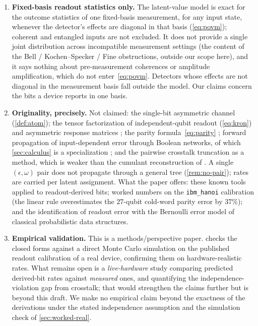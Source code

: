 \documentclass[11pt]{article}
\numberwithin{equation}{section}
\theoremstyle{plain}
\theoremstyle{definition}
\theoremstyle{remark}
\newcommand{\eps}{\epsilon}
\begin{document}
\begin{enumerate}[leftmargin=1.6em]
  \item \textbf{Fixed-basis readout statistics only.} The latent-value model is
        exact for the outcome statistics of one fixed-basis measurement, for any
        input state, whenever the detector's effects are diagonal in that basis
        (\cref{eq:povm}); coherent and entangled inputs are not excluded. It
        does not provide a single joint distribution across incompatible
        measurement settings (the content of the Bell / Kochen--Specker / Fine
        obstructions, outside our scope here), and it says nothing about
        pre-measurement coherences or amplitude amplification, which do not
        enter~\eqref{eq:povm}. Detectors whose effects are not diagonal in the
        measurement basis fall outside the model. Our claims concern the bits a
        device reports in one basis.

  \item \textbf{Originality, precisely.} Not claimed: the single-bit asymmetric
        channel (\cref{def:atom}); the tensor factorization of independent-qubit
        readout (\cref{eq:kron}) and asymmetric response matrices
        \citep{smith2021bitflip}; the parity formula~\eqref{eq:parity}
        \citep{gallager1962ldpc,matsui1993linear}; forward propagation of
        input-dependent error through Boolean networks, of which
        \cref{sec:calculus} is a specialization
        \citep{parker1975probabilistic,krishnaswamy2008ptm}; and the pairwise
        crosstalk truncation as a method, which is weaker than the cumulant
        reconstruction of \citet{hamilton2020scalable}. A single
        $(\eps,\omega)$ pair does not propagate through a general tree
        (\cref{rem:no-pair}); rates are carried per latent assignment. What
        the paper offers: these known tools applied to readout-derived bits;
        worked numbers on the \texttt{ibm\_hanoi} calibration (the linear rule
        overestimates the $27$-qubit cold-word parity error by $37\%$); and the
        identification of readout error with the Bernoulli error model of
        classical probabilistic data structures.

  \item \textbf{Empirical validation.} This is a methods/perspective paper.
         checks the closed forms against a direct Monte Carlo
        simulation on the published readout calibration of a real device,
        confirming them on hardware-realistic rates. What remains open is a
        \emph{live-hardware} study comparing predicted derived-bit rates against
        \emph{measured} ones, and quantifying the independence-violation gap from
        crosstalk; that would strengthen the claims further but is beyond this
        draft. We make no empirical claim beyond the exactness of the derivations
        under the stated independence assumption and the simulation check of
        \cref{sec:worked-real}.
\end{enumerate}
\end{document}
